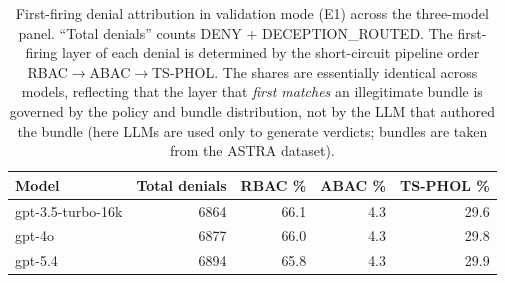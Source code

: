 \documentclass[10pt,a4paper,twocolumn]{article}
\begin{document}
\begin{table}[H]
\centering
\caption{First-firing denial attribution in validation mode (E1) across the three-model panel. ``Total denials'' counts DENY + DECEPTION\_ROUTED. The first-firing layer of each denial is determined by the short-circuit pipeline order RBAC$\to$ABAC$\to$TS-PHOL. The shares are essentially identical across models, reflecting that the layer that \emph{first matches} an illegitimate bundle is governed by the policy and bundle distribution, not by the LLM that authored the bundle (here LLMs are used only to generate verdicts; bundles are taken from the ASTRA dataset).}
\label{tab:attribution_full}
\small
\setlength{\tabcolsep}{4pt}
\begin{tabular}{@{}lrrrr@{}}
\toprule
\textbf{Model} & \textbf{Total denials} & \textbf{RBAC \%} & \textbf{ABAC \%} & \textbf{TS-PHOL \%} \\
\midrule
gpt-3.5-turbo-16k & 6864 & 66.1 & 4.3 & 29.6 \\
gpt-4o            & 6877 & 66.0 & 4.3 & 29.8 \\
gpt-5.4           & 6894 & 65.8 & 4.3 & 29.9 \\
\bottomrule
\end{tabular}
\end{table}
\end{document}

